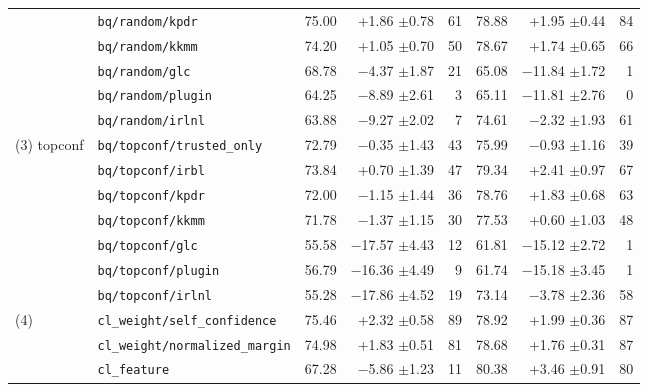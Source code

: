 \begin{tabular}{llrrrrrr}
 & \texttt{bq/random/kpdr} & 75.00 & +1.86 {\scriptsize$\pm$0.78} & 61 & 78.88 & +1.95 {\scriptsize$\pm$0.44} & 84 \\
 & \texttt{bq/random/kkmm} & 74.20 & +1.05 {\scriptsize$\pm$0.70} & 50 & 78.67 & +1.74 {\scriptsize$\pm$0.65} & 66 \\
 & \texttt{bq/random/glc} & 68.78 & $-$4.37 {\scriptsize$\pm$1.87} & 21 & 65.08 & $-$11.84 {\scriptsize$\pm$1.72} & 1 \\
 & \texttt{bq/random/plugin} & 64.25 & $-$8.89 {\scriptsize$\pm$2.61} & 3 & 65.11 & $-$11.81 {\scriptsize$\pm$2.76} & 0 \\
 & \texttt{bq/random/irlnl} & 63.88 & $-$9.27 {\scriptsize$\pm$2.02} & 7 & 74.61 & $-$2.32 {\scriptsize$\pm$1.93} & 61 \\
\addlinespace
(3) topconf & \texttt{bq/topconf/trusted\_only} & 72.79 & $-$0.35 {\scriptsize$\pm$1.43} & 43 & 75.99 & $-$0.93 {\scriptsize$\pm$1.16} & 39 \\
 & \texttt{bq/topconf/irbl} & 73.84 & +0.70 {\scriptsize$\pm$1.39} & 47 & 79.34 & +2.41 {\scriptsize$\pm$0.97} & 67 \\
 & \texttt{bq/topconf/kpdr} & 72.00 & $-$1.15 {\scriptsize$\pm$1.44} & 36 & 78.76 & +1.83 {\scriptsize$\pm$0.68} & 63 \\
 & \texttt{bq/topconf/kkmm} & 71.78 & $-$1.37 {\scriptsize$\pm$1.15} & 30 & 77.53 & +0.60 {\scriptsize$\pm$1.03} & 48 \\
 & \texttt{bq/topconf/glc} & 55.58 & $-$17.57 {\scriptsize$\pm$4.43} & 12 & 61.81 & $-$15.12 {\scriptsize$\pm$2.72} & 1 \\
 & \texttt{bq/topconf/plugin} & 56.79 & $-$16.36 {\scriptsize$\pm$4.49} & 9 & 61.74 & $-$15.18 {\scriptsize$\pm$3.45} & 1 \\
 & \texttt{bq/topconf/irlnl} & 55.28 & $-$17.86 {\scriptsize$\pm$4.52} & 19 & 73.14 & $-$3.78 {\scriptsize$\pm$2.36} & 58 \\
\addlinespace
(4) & \texttt{cl\_weight/self\_confidence} & 75.46 & +2.32 {\scriptsize$\pm$0.58} & 89 & 78.92 & +1.99 {\scriptsize$\pm$0.36} & 87 \\
 & \texttt{cl\_weight/normalized\_margin} & 74.98 & +1.83 {\scriptsize$\pm$0.51} & 81 & 78.68 & +1.76 {\scriptsize$\pm$0.31} & 87 \\
 & \texttt{cl\_feature} & 67.28 & $-$5.86 {\scriptsize$\pm$1.23} & 11 & 80.38 & +3.46 {\scriptsize$\pm$0.91} & 80 \\
\bottomrule
\end{tabular}
